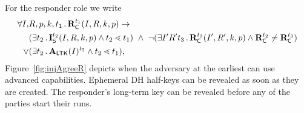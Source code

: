 %
For the responder role we write
\begin{align*}
    \forall I,& R, p, k, t_1\mLogicDot \mRComplete^{t_1}(I, R, k, p)
    \rightarrow\\
    &(\exists t_2\mLogicDot \mIStart^{t_2}(I, R, k, p) \land t_2 \lessdot t_1)\ 
    \land\ \neg(\exists I' R' t_3 \mLogicDot \mRComplete^{t_3}(I' , R', k, p)
        \land \mRComplete^{t_2} \not = \mRComplete^{t_3}) \\
    \lor&(\exists t_2\mLogicDot \mRevLTK{I}^{t_2} \land t_2 \lessdot t_1),
\end{align*}
%
Figure~\ref{fig:injAgreeR} depicts when the adversary at the earliest can use
advanced capabilities.
%
Ephemeral DH half-keys can be revealed as soon as they are created.
%
The responder's long-term key can be revealed before any of the parties start
their runs.
%
